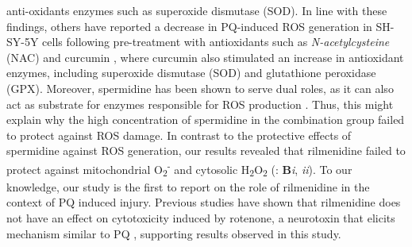 anti-oxidants enzymes such as superoxide dismutase (SOD). In line with these findings, others have reported a decrease in PQ-induced ROS generation in SH-SY-5Y cells following pre-treatment with antioxidants such as \textit{N-acetylcysteine} (NAC) \citep{Zhou2017} and curcumin \citep{Jaroonwitchawan2017}, where curcumin also stimulated an increase in antioxidant enzymes, including superoxide dismutase (SOD) and glutathione peroxidase (GPX). Moreover, spermidine has been shown to serve dual roles, as it can also act as substrate for enzymes responsible for ROS production \citep{Stewart2018}. Thus, this might explain why the high concentration of spermidine in the combination group failed to protect against ROS damage. In contrast to the protective effects of spermidine against ROS generation, our results revealed that rilmenidine failed to protect against mitochondrial O\textsubscript{2}\textsuperscript{-} and cytosolic H\textsubscript{2}O\textsubscript{2} (: \textbf{B}\textit{i}, \textit{ii}). To our knowledge, our study is the first to report on the role of  rilmenidine in the context of PQ induced injury. Previous studies have shown that rilmenidine does not have an effect on cytotoxicity induced by rotenone, a neurotoxin that elicits mechanism similar to PQ \citep{Choi2002}, supporting results observed in this study.


